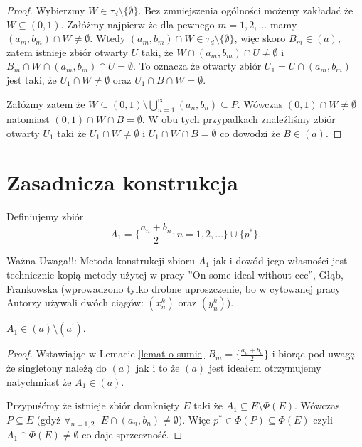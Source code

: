 \documentclass[12pt]{amsart}
\theoremstyle{plain}
\theoremstyle{definition}
\theoremstyle{remark}
\newcommand{\aideal}{\mathit{(a)}}
\newcommand{\aidealprime}{\mathit{(a^\prime)}}
\begin{document}
\begin{proof}
Wybierzmy $W \in \tau_d \setminus \lbrace \emptyset \rbrace$.
Bez zmniejszenia ogólności możemy zakładać że 
$W \subseteq (0, 1)$. Załóżmy najpierw że dla pewnego 
$m = 1,2,\ldots$ mamy $(a_m, b_m) \cap W \not= \emptyset$.
Wtedy $(a_m, b_m) \cap W \in \tau_d \setminus \lbrace \emptyset \rbrace$,
więc skoro $B_m \in \aideal$, zatem istnieje zbiór otwarty $U$ 
taki, że $W \cap (a_m, b_m) \cap U \not=\emptyset$
i $B_m \cap W \cap (a_m, b_m) \cap U = \emptyset$. To oznacza że
otwarty zbiór $U_1 = U \cap (a_m, b_m)$ jest taki, że $U_1 \cap W \not=\emptyset$
oraz $U_1 \cap B \cap W = \emptyset$.

Załóżmy zatem że $W \subseteq (0,1) \setminus \bigcup_{n=1}^\infty (a_n, b_n) \subseteq P$.
Wówczas $(0,1) \cap W \not= \emptyset$
natomiast  $(0,1) \cap W \cap B = \emptyset$.
W obu tych przypadkach znaleźliśmy zbiór otwarty $U_1$ taki że
$U_1 \cap W \not=\emptyset$ i $U_1 \cap W \cap B = \emptyset$
co dowodzi że $B \in \aideal$.
\end{proof}

\section{Zasadnicza konstrukcja}

Definiujemy zbiór
\[ A_1 = \lbrace \frac{a_n + b_n}{2} \colon n = 1,2,\ldots\rbrace \cup \lbrace p^* \rbrace.
\]

Ważna Uwaga!!: Metoda konstrukcji zbioru $A_1$ jak i dowód 
jego własności jest technicznie kopią metody
użytej w pracy ''On some ideal without ccc'', Głąb, Frankowska (wprowadzono tylko drobne uproszczenie, bo w
cytowanej pracy Autorzy używali dwóch ciągów: $(x_n^k)$ oraz $(y_n^k)$).

 $A_1 \in \aideal \setminus \aidealprime$.
\begin{proof}
Wstawiając w Lemacie \ref{lemat-o-sumie} 
$B_m = \lbrace \frac{a_n + b_n}{2} \rbrace$
i biorąc pod uwagę że singletony należą do $\aideal$ jak i to że
$\aideal$ jest ideałem otrzymujemy natychmiast że $A_1 \in \aideal$.

\smallskip

Przypuśćmy że istnieje zbiór domknięty $E$ taki że
$A_1 \subseteq E \setminus \Phi(E)$.
Wówczas $P \subseteq E$ (gdyż $\forall_{n=1,2\ldots} E \cap (a_n, b_n) \not= \emptyset$).
Więc $p^* \in \Phi(P) \subseteq \Phi(E)$ czyli $A_1 \cap \Phi(E) \not= \emptyset$
co daje sprzeczność.
\end{proof}
\end{document}
